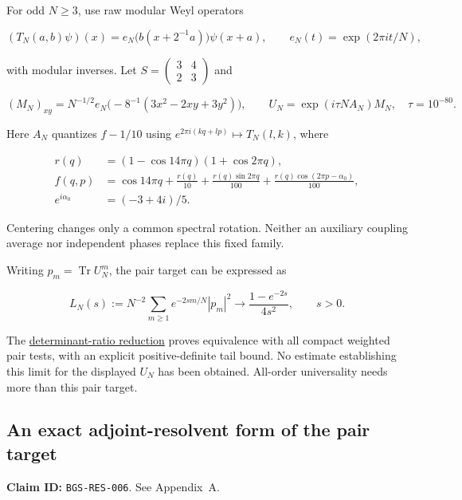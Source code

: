 For odd \(N\ge3\), use raw modular Weyl operators

\[
(T_N(a,b)\psi)(x)=e_N\bigl(b(x+2^{-1}a)\bigr)\psi(x+a),
\qquad e_N(t)=\exp(2\pi i t/N),
\]

with modular inverses. Let \(S=\left(\begin{smallmatrix}3&4\\2&3\end{smallmatrix}\right)\) and

\[
(M_N)_{xy}=N^{-1/2}e_N\bigl(-8^{-1}(3x^2-2xy+3y^2)\bigr),
\qquad U_N=\exp(i\tau N A_N)M_N,\quad \tau=10^{-80}.
\]

Here \(A_N\) quantizes \(f-1/10\) using \(e^{2\pi i(kq+lp)}\mapsto T_N(l,k)\),
where

\[
\begin{split}
r(q)&=(1-\cos14\pi q)(1+\cos2\pi q),\\
f(q,p)&=\cos14\pi q+\frac{r(q)}{10}
 +\frac{r(q)\sin2\pi q}{100}
 +\frac{r(q)\cos(2\pi p-\alpha_0)}{100},\\
e^{i\alpha_0}&=(-3+4i)/5.
\end{split}
\]

Centering changes only a common spectral rotation. Neither an auxiliary
coupling average nor independent phases replace this fixed family.

Writing \(p_m=\operatorname{Tr}U_N^m\), the pair target can be expressed as

\[
L_N(s):=N^{-2}\sum_{m\ge1}e^{-2sm/N}|p_m|^2
 \longrightarrow \frac{1-e^{-2s}}{4s^2},\qquad s>0.
\]

The \href{https://github.com/ChurilovMaksim/BGS/blob/main/supplement/fixed_map/weighted-secular/determinant_boundary.md}{determinant-ratio reduction}
proves equivalence with all compact weighted pair tests, with an explicit
positive-definite tail bound. No estimate establishing this limit for the
displayed \(U_N\) has been obtained. All-order universality needs more than
this pair target.

\hypertarget{an-exact-adjoint-resolvent-form-of-the-pair-target}{%
\subsection{An exact adjoint-resolvent form of the pair target}\label{an-exact-adjoint-resolvent-form-of-the-pair-target}}

\textbf{Claim ID:} \texttt{BGS-RES-006}. See Appendix~A.

